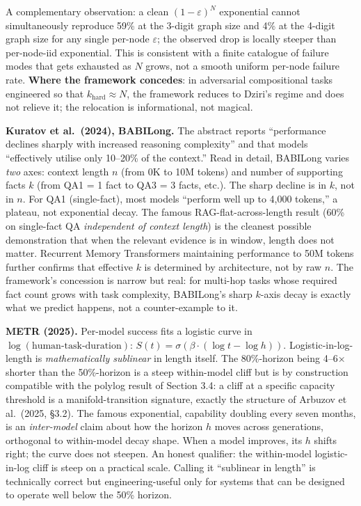 \documentclass[
]{article}
\begin{document}
A complementary observation: a clean \((1 - \varepsilon)^N\) exponential
cannot simultaneously reproduce 59\% at the 3-digit graph size and 4\%
at the 4-digit graph size for any single per-node \(\varepsilon\); the
observed drop is locally steeper than per-node-iid exponential. This is
consistent with a finite catalogue of failure modes that gets exhausted
as \(N\) grows, not a smooth uniform per-node failure rate.
\textbf{Where the framework concedes}: in adversarial compositional
tasks engineered so that \(k_{\text{hard}} \approx N\), the framework
reduces to Dziri's regime and does not relieve it; the relocation is
informational, not magical.

\textbf{Kuratov et al.~(2024), BABILong.} The abstract reports
``performance declines sharply with increased reasoning complexity'' and
that models ``effectively utilise only 10--20\% of the context.'' Read
in detail, BABILong varies \emph{two} axes: context length \(n\) (from
0K to 10M tokens) and number of supporting facts \(k\) (from QA1 = 1
fact to QA3 = 3 facts, etc.). The sharp decline is in \(k\), not in
\(n\). For QA1 (single-fact), most models ``perform well up to 4,000
tokens,'' a plateau, not exponential decay. The famous
RAG-flat-across-length result (60\% on single-fact QA \emph{independent
of context length}) is the cleanest possible demonstration that when the
relevant evidence is in window, length does not matter. Recurrent Memory
Transformers maintaining performance to 50M tokens further confirms that
effective \(k\) is determined by architecture, not by raw \(n\). The
framework's concession is narrow but real: for multi-hop tasks whose
required fact count grows with task complexity, BABILong's sharp
\(k\)-axis decay is exactly what we predict happens, not a
counter-example to it.

\textbf{METR (2025).} Per-model success fits a logistic curve in
\(\log(\text{human-task-duration})\):
\(S(t) = \sigma(\beta \cdot (\log t - \log h))\). Logistic-in-log-length
is \emph{mathematically sublinear} in length itself. The 80\%-horizon
being 4--6× shorter than the 50\%-horizon is a steep within-model cliff
but is by construction compatible with the polylog result of Section
3.4: a cliff at a specific capacity threshold is a manifold-transition
signature, exactly the structure of Arbuzov et al.~(2025, §3.2). The
famous exponential, capability doubling every seven months, is an
\emph{inter-model} claim about how the horizon \(h\) moves across
generations, orthogonal to within-model decay shape. When a model
improves, its \(h\) shifts right; the curve does not steepen. An honest
qualifier: the within-model logistic-in-log cliff is steep on a
practical scale. Calling it ``sublinear in length'' is technically
correct but engineering-useful only for systems that can be designed to
operate well below the 50\% horizon.
\end{document}
